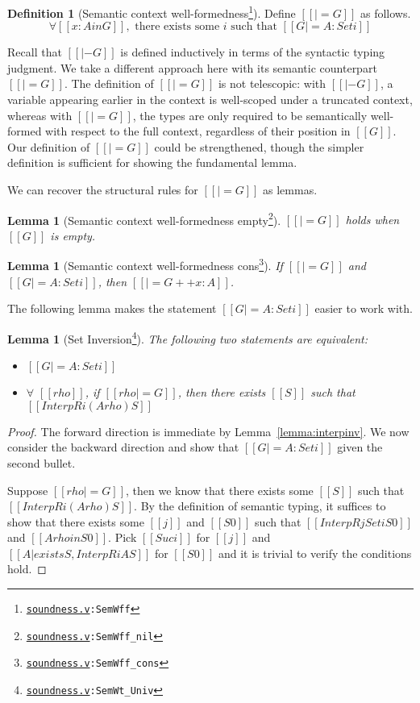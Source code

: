 \documentclass[\ifpublic nolinenum\else\fi,online,OA]{jfp}
\newcommand{\dotv}[2]{\href{#1}{\texttt{#1}}{\texttt{:#2}}}
\newtheorem{lemma}[theorem]{Lemma}
\theoremstyle{definition}
\newtheorem{definition}[theorem]{Definition}
\begin{document}
\begin{definition}[Semantic context well-formedness\footnote{\dotv{soundness.v}{SemWff}}]
Define $[[|= G]]$ as follows.
\[ \forall [[x : A in G]],\text{ there exists some } i \text{ such that } [[G |= A : Set i]] \]
\end{definition}
Recall that $[[|- G]]$ is defined inductively in terms of the
syntactic typing judgment. We take a different approach here with its
semantic counterpart $[[|= G]]$. The definition of
$[[|= G]]$ is not telescopic: with $[[|- G]]$, a variable appearing
earlier in the context is well-scoped under a truncated context,
whereas with $[[|= G]]$, the types are only required to be
semantically well-formed with respect to the full context, regardless
of their position in $[[G]]$. Our definition of $[[|= G]]$ could be
strengthened, though the simpler definition is sufficient for showing the
fundamental lemma.

We can recover the structural rules for $[[|= G]]$ as lemmas.
\begin{lemma}[Semantic context well-formedness empty\footnote{\dotv{soundness.v}{SemWff\_nil}}]
  \label{lemma:semwffempty}
  $[[|= G]]$ holds when $[[G]]$ is empty.
\end{lemma}
\begin{lemma}[Semantic context well-formedness cons\footnote{\dotv{soundness.v}{SemWff\_cons}}]
  \label{lemma:semwffcons}
  If $[[|= G]]$ and $[[G |= A : Set i]]$, then $[[|= G ++ x : A]]$.
\end{lemma}

The following lemma makes the statement $[[G |= A : Set i]]$ easier to
work with.
\begin{lemma}[Set Inversion\footnote{\dotv{soundness.v}{SemWt\_Univ}}]
  \label{lemma:setinv}
  The following two statements are equivalent:
  \begin{itemize}
  \item $[[G |= A : Set i]]$
  \item $\forall$ $[[rho]]$, if $[[rho |= G]]$, then there exists
    $[[S]]$ such that $[[InterpR i (A {rho}) S]]$
  \end{itemize}
\end{lemma}
\begin{proof}
  The forward direction is immediate by
  Lemma~\ref{lemma:interpinv}. We now consider the backward direction
  and show that $[[G |= A : Set i]]$ given the second bullet.

  Suppose $[[rho |= G]]$, then we know that there exists some $[[S]]$
  such that $[[InterpR i (A {rho}) S]]$. By the definition of semantic
  typing, it suffices to show that there exists some $[[j]]$ and
  $[[S0]]$ such that  $[[InterpR j Set i S0]]$ and $[[A {rho} in
  S0]]$.
  Pick $[[Suc i]]$ for $[[j]]$ and $[[ { A | exists S , InterpR i A S }
  ]]$ for $[[S0]]$ and it is trivial to verify the conditions hold.
\end{proof}
\end{document}
